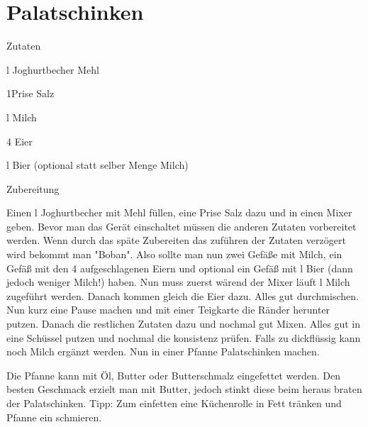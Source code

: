 \chapter*{Palatschinken}
\begin{multicols}{2}
 {\Large Zutaten}
 \begin{Zutaten}
		\item {}l Joghurtbecher Mehl
		\item 1Prise Salz
		\item {}l Milch
		\item 4 Eier
		\item {}l Bier (optional statt selber Menge Milch)
		
		
		
\end{Zutaten}
	
\columnbreak
{}
\end{multicols}

{\Large Zubereitung} \newline
\begin{addmargin}[1cm]{0cm}
	Einen l Joghurtbecher mit Mehl füllen, eine Prise Salz dazu und in einen Mixer geben.\newline
	Bevor man das Gerät einschaltet müssen die anderen Zutaten vorbereitet werden. Wenn durch das späte
	Zubereiten das zuführen der Zutaten verzögert wird bekommt man "Boban".\newline
	Also sollte man nun zwei Gefäße mit  Milch, ein Gefäß mit den 4 aufgeschlagenen Eiern und
	optional ein Gefäß mit l Bier (dann jedoch weniger Milch!) haben.\newline
	Nun muss zuerst wärend der Mixer läuft l Milch zugeführt werden. Danach kommen gleich die Eier
	dazu. Alles gut durchmischen.\newline
	Nun kurz eine Pause machen und mit einer Teigkarte die Ränder herunter putzen.
	Danach die restlichen Zutaten dazu und nochmal gut Mixen.\newline
	Alles gut in eine Schüssel putzen und nochmal die konsistenz prüfen. Falls zu dickflüssig kann noch
	Milch ergänzt werden.\newline
	Nun in einer Pfanne Palatschinken machen.\newline\newline
	
	Die Pfanne kann mit Öl, Butter oder Butterschmalz eingefettet werden. Den besten Geschmack erzielt
	man mit Butter, jedoch stinkt diese beim heraus braten der Palatschinken.\newline
	Tipp: Zum einfetten eine Küchenrolle in Fett tränken und Pfanne ein schmieren.
	
	
	
\end{addmargin}
